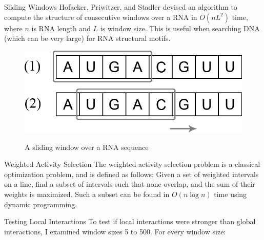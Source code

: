\documentclass[final]{beamer}
\newlength{\onecolwid}
\begin{document}
\begin{frame}[t]
\begin{columns}[t]
\begin{column}{\onecolwid}
    \begin{block}{Sliding Windows}
            Hofacker, Priwitzer, and Stadler \cite{hofacker2008rna} devised an algorithm to compute the structure of consecutive windows over a RNA in $O(nL^2)$ time, where $n$ is RNA length and $L$ is window size. This is useful when searching DNA (which can be very large) for RNA structural motifs.
\vspace{0.25in}
        \begin{figure}
          \begin{center}
            \includegraphics[width=10in]{slidingwindow.png} \\
            \caption{A sliding window over a RNA sequence}
            \label{fig:slidingwindow}
          \end{center}
        \end{figure}            
            \vspace{0.25in}
         
          \end{block}
    
     \begin{block}{Weighted Activity Selection}
The weighted activity selection problem is a classical optimization problem, and is defined as follows: Given a set of weighted intervals on a line, find a subset of intervals such that none overlap, and the sum of their weights is maximized. Such a subset can be found in $O(n \log n)$ time using dynamic programming.
\vspace{0.25in}
         
          \end{block} 
          
          
     \begin{block}{Testing Local Interactions}
To test if local interactions were stronger than global interactions, I examined window sizes 5 to 500. For every window size:


\end{block}
\end{column}
\end{columns}
\end{frame}
\end{document}

